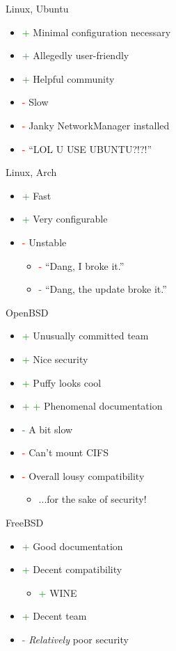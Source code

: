 \documentclass{beamer}
\newcommand{\good}{\textcolor{green}{+ }}
\newcommand{\bad}{\textcolor{red}{- }}
\begin{document}
			\begin{frame}{Linux, Ubuntu}
				\begin{itemize}
					\item \good Minimal configuration necessary
					\item \good Allegedly user-friendly
					\item \good Helpful community
					\item \bad Slow
					\item \bad Janky NetworkManager installed
					\item \bad ``LOL U USE UBUNTU?!?!''
				\end{itemize}
			\end{frame}
			\begin{frame}{Linux, Arch}
				\begin{itemize}
					\item \good Fast
					\item \good Very configurable
					\item \bad Unstable
					\begin{itemize}
						\item \bad ``Dang, I broke it.''
						\item \bad ``Dang, the update broke it.''
					\end{itemize}
				\end{itemize}
			\end{frame}
			\begin{frame}{OpenBSD}
				\begin{itemize}
					\item \good Unusually committed team
					\item \good Nice security
					\item \good Puffy looks cool
					\item \good \good Phenomenal documentation
					\item \bad A bit slow
					\item \bad Can't mount CIFS
					\item \bad Overall lousy compatibility
					\begin{itemize}
						\item ...for the sake of security!
					\end{itemize}
				\end{itemize}
			\end{frame}
			\begin{frame}{FreeBSD}
				\begin{itemize}
					\item \good Good documentation
					\item \good Decent compatibility
					\begin{itemize}
						\item \good WINE
					\end{itemize}
					\item \good Decent team
					\item \bad \textit{Relatively} poor security
				\end{itemize}
			\end{frame}
\end{document}
